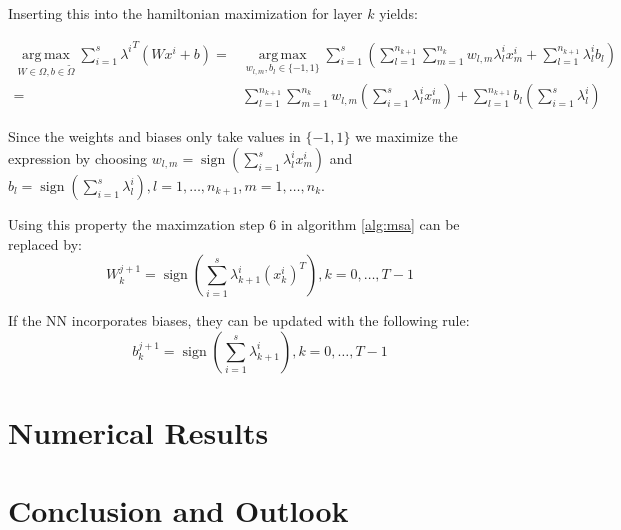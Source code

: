 \documentclass[a4paper, 12pt]{scrreprt} %
\DeclareMathOperator*{\argmax}{arg\,max}
\DeclareMathOperator*{\sign}{sign}
\begin{document}
Inserting this into the hamiltonian maximization for layer $k$ yields:

\begin{align}
\underset{W\in \Omega, b \in \tilde\Omega}{\argmax} \sum_{i=1}^s{{\lambda^{i}}^T (W x^{i} + b)} =& \underset{w_{l,m}, b_l \in \{-1,1\}}{\argmax} \sum_{i=1}^s \left( \sum_{l=1}^{n_{k+1}} \sum_{m=1}^{n_{k}} {w_{l,m} \lambda^i_l x^i_m} + \sum_{l=1}^{n_{k+1}} {\lambda^i_l b_l} \right) \\
 =& \sum_{l=1}^{n_{k+1}} \sum_{m=1}^{n_{k}} w_{l,m} \left( \sum_{i=1}^s \lambda^i_l x^i_m \right) + \sum_{l=1}^{n_{k+1}} b_l \left( \sum_{i=1}^s \lambda^i_l \right)
\end{align}

Since the weights and biases only take values in $\{-1,1\}$ we maximize the expression by choosing $w_{l,m} = \sign\left( \sum_{i=1}^s \lambda^i_l x^i_m\right)$ and $b_l = \sign \left( \sum_{i=1}^s \lambda^i_l \right), l=1,\dots,n_{k+1}, m=1,\dots,n_k$.

Using this property the maximzation step 6 in algorithm \ref{alg:msa} can be replaced by:
\begin{equation}
W_k^{j+1} = \sign\left(\sum_{i=1}^s \lambda_{k+1}^i ({x_k^i})^T\right), k=0,\dots,T-1
\label{eq:wsgnmax}
\end{equation}

If the \ac{NN} incorporates biases, they can be updated with the following rule:
\begin{equation}
b_k^{j+1} = \sign\left( \sum_{i=1}^s \lambda_{k+1}^i \right), k=0,\dots,T-1 
\label{eq:bsgnmax}
\end{equation}


\chapter{Numerical Results}
\label{chap:NR}



\chapter{Conclusion and Outlook}
\label{chap:CaO}
\end{document}
